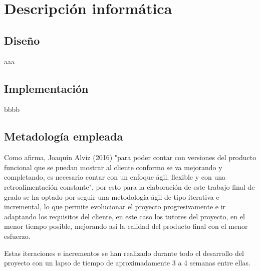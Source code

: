 
\chapter{Descripción informática} %

\label{Chapter4} %


\section{Diseño}
aaa

\section{Implementación}
bbbb

\section{Metadología empleada}
Como afirma, Joaquín Alviz (2016) \cite{Reference1} "para poder contar con versiones del producto funcional que se puedan mostrar al cliente conformo se va mejorando y completando, es necesario contar con un enfoque ágil, flexible y con una retroalimentación constante", por esto para la elaboración de este trabajo final de grado se ha optado por seguir una metodología ágil de tipo iterativa e incremental, lo que permite evolucionar el proyecto progresivamente e ir adaptando los requisitos del cliente, en este caso los tutores del proyecto, en el menor tiempo posible, mejorando así la calidad del producto final con el menor esfuerzo.

Estas iteraciones e incrementos se han realizado durante todo el desarrollo del proyecto con un lapso de tiempo de aproximadamente 3 a 4 semanas entre ellas.


